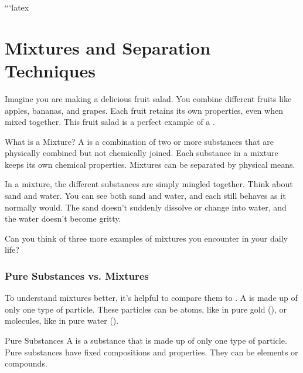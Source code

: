 ```latex
\chapter{Mixtures and Separation Techniques}


\FloatBarrier
\1

Imagine you are making a delicious fruit salad. You combine different fruits like apples, bananas, and grapes. Each fruit retains its own properties, even when mixed together.  This fruit salad is a perfect example of a .

\begin{keyconcept}{What is a Mixture?}
A  is a combination of two or more substances that are physically combined but not chemically joined. Each substance in a mixture keeps its own chemical properties. Mixtures can be separated by physical means.
\end{keyconcept}

In a mixture, the different substances are simply mingled together.  Think about sand and water. You can see both sand and water, and each still behaves as it normally would.  The sand doesn't suddenly dissolve or change into water, and the water doesn't become gritty.


\begin{stopandthink}
Can you think of three more examples of mixtures you encounter in your daily life?
\end{stopandthink}

\subsection{Pure Substances vs. Mixtures}

To understand mixtures better, it's helpful to compare them to . A  is made up of only one type of particle.  These particles can be atoms, like in pure gold (), or molecules, like in pure water ().

\begin{keyconcept}{Pure Substances}
A  is a substance that is made up of only one type of particle. Pure substances have fixed compositions and properties. They can be elements or compounds.
\end{keyconcept}

